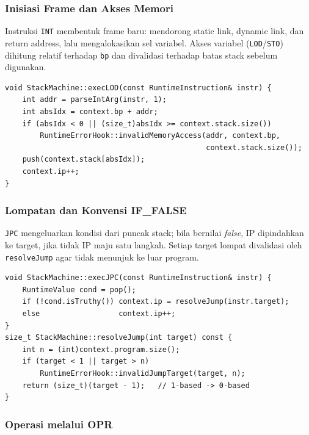 \subsubsection{Inisiasi Frame dan Akses Memori}

Instruksi \texttt{INT} membentuk frame baru: mendorong static link, dynamic link,
dan return address, lalu mengalokasikan sel variabel. Akses variabel
(\texttt{LOD}/\texttt{STO}) dihitung relatif terhadap \texttt{bp} dan divalidasi
terhadap batas stack sebelum digunakan.

\begin{lstlisting}[style=kodeCpp, caption={\texttt{LOD} dengan validasi akses memori (mencegah OOB).}]
void StackMachine::execLOD(const RuntimeInstruction& instr) {
    int addr = parseIntArg(instr, 1);
    int absIdx = context.bp + addr;
    if (absIdx < 0 || (size_t)absIdx >= context.stack.size())
        RuntimeErrorHook::invalidMemoryAccess(addr, context.bp,
                                              context.stack.size());
    push(context.stack[absIdx]);
    context.ip++;
}
\end{lstlisting}

\subsubsection{Lompatan dan Konvensi IF\_FALSE}

\texttt{JPC} mengeluarkan kondisi dari puncak stack; bila bernilai \emph{false}, IP
dipindahkan ke target, jika tidak IP maju satu langkah. Setiap target lompat
divalidasi oleh \texttt{resolveJump} agar tidak menunjuk ke luar program.

\begin{lstlisting}[style=kodeCpp, caption={\texttt{JPC} (jump-if-false) dan validasi target lompat.}]
void StackMachine::execJPC(const RuntimeInstruction& instr) {
    RuntimeValue cond = pop();
    if (!cond.isTruthy()) context.ip = resolveJump(instr.target);
    else                  context.ip++;
}
size_t StackMachine::resolveJump(int target) const {
    int n = (int)context.program.size();
    if (target < 1 || target > n)
        RuntimeErrorHook::invalidJumpTarget(target, n);
    return (size_t)(target - 1);   // 1-based -> 0-based
}
\end{lstlisting}

\subsubsection{Operasi melalui OPR}

